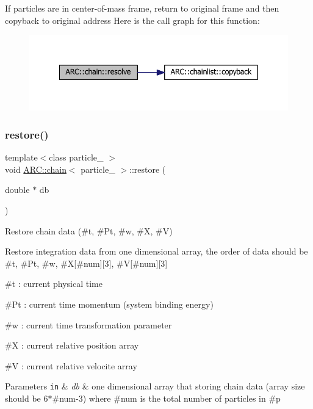 If particles are in center-\/of-\/mass frame, return to original frame and then copyback to original address Here is the call graph for this function\+:
\nopagebreak
\begin{figure}[H]
\begin{center}
\leavevmode
\includegraphics[width=342pt]{classARC_1_1chain_a4f6a1518c7c788a9ef3d12dd8e5aec7a_cgraph}
\end{center}
\end{figure}
\hypertarget{classARC_1_1chain_a5eb2661715a3bf90cad65503f4a5e184}{}\label{classARC_1_1chain_a5eb2661715a3bf90cad65503f4a5e184} 
\subsubsection{\texorpdfstring{restore()}{restore()}}
{\footnotesize\ttfamily template$<$class particle\+\_\+ $>$ \\
void \hyperlink{classARC_1_1chain}{A\+R\+C\+::chain}$<$ particle\+\_\+ $>$\+::restore (\begin{DoxyParamCaption}\item[{double $\ast$}]{db }\end{DoxyParamCaption})\hspace{0.3cm}{\ttfamily [inline]}}



Restore chain data (\#t, \#\+Pt, \#w, \#X, \#V) 

Restore integration data from one dimensional array, the order of data should be \#t, \#\+Pt, \#w, \#X\mbox{[}\#num\mbox{]}\mbox{[}3\mbox{]}, \#V\mbox{[}\#num\mbox{]}\mbox{[}3\mbox{]}
\begin{DoxyItemize}
\item \#t \+: current physical time
\item \#\+Pt \+: current time momentum (system binding energy)
\item \#w \+: current time transformation parameter
\item \#X \+: current relative position array
\item \#V \+: current relative velocite array 
\begin{DoxyParams}[1]{Parameters}
\mbox{\tt in}  & {\em db} & one dimensional array that storing chain data (array size should be 6$\ast$\#num-\/3) where \#num is the total number of particles in \#p \\
\hline
\end{DoxyParams}

\end{DoxyItemize}

